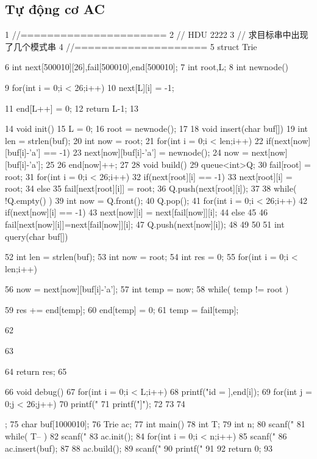 \documentclass[11pt]{article}
\begin{document}
\subsection{Tự động cơ AC}

\begin{Code}
 1   //======================
 2   // HDU 2222
 3   // 求目标串中出现了几个模式串
 4   //====================
 5   struct Trie{
 6       int next[500010][26],fail[500010],end[500010];
 7       int root,L;
 8       int newnode(){
 9           for(int i = 0;i < 26;i++)
10                next[L][i] = -1;


11              end[L++] = 0;
12              return L-1;
13       }
14       void init(){
15           L = 0;
16           root = newnode();
17       }
18       void insert(char buf[]){
19           int len = strlen(buf);
20           int now = root;
21           for(int i = 0;i < len;i++){
22               if(next[now][buf[i]-'a'] == -1)
23                   next[now][buf[i]-'a'] = newnode();
24               now = next[now][buf[i]-'a'];
25           }
26           end[now]++;
27       }
28       void build(){
29           queue<int>Q;
30           fail[root] = root;
31           for(int i = 0;i < 26;i++)
32               if(next[root][i] == -1)
33                   next[root][i] = root;
34               else{
35                   fail[next[root][i]] = root;
36                   Q.push(next[root][i]);
37               }
38           while( !Q.empty() ){
39               int now = Q.front();
40               Q.pop();
41               for(int i = 0;i < 26;i++)
42                   if(next[now][i] == -1)
43                        next[now][i] = next[fail[now]][i];
44                   else
45                   {
46                        fail[next[now][i]]=next[fail[now]][i];
47                        Q.push(next[now][i]);
48                   }
49           }
50       }
51       int query(char buf[]){
52           int len = strlen(buf);
53           int now = root;
54           int res = 0;
55           for(int i = 0;i < len;i++){
56               now = next[now][buf[i]-'a'];
57               int temp = now;
58               while( temp != root ){
59                   res += end[temp];
60                   end[temp] = 0;
61                   temp = fail[temp];


62                  }
63              }
64              return res;
65         }
66         void debug(){
67             for(int i = 0;i < L;i++){
68                 printf("id = %
                      ],end[i]);
69                 for(int j = 0;j < 26;j++)
70                     printf("%
71                 printf("]\n");
72             }
73         }
74   };
75   char buf[1000010];
76   Trie ac;
77   int main(){
78       int T;
79       int n;
80       scanf("%
81       while( T-- ){
82            scanf("%
83            ac.init();
84            for(int i = 0;i < n;i++){
85                scanf("%
86                ac.insert(buf);
87            }
88            ac.build();
89            scanf("%
90            printf("%
91       }
92       return 0;
93   }
\end{Code}
\end{document}
